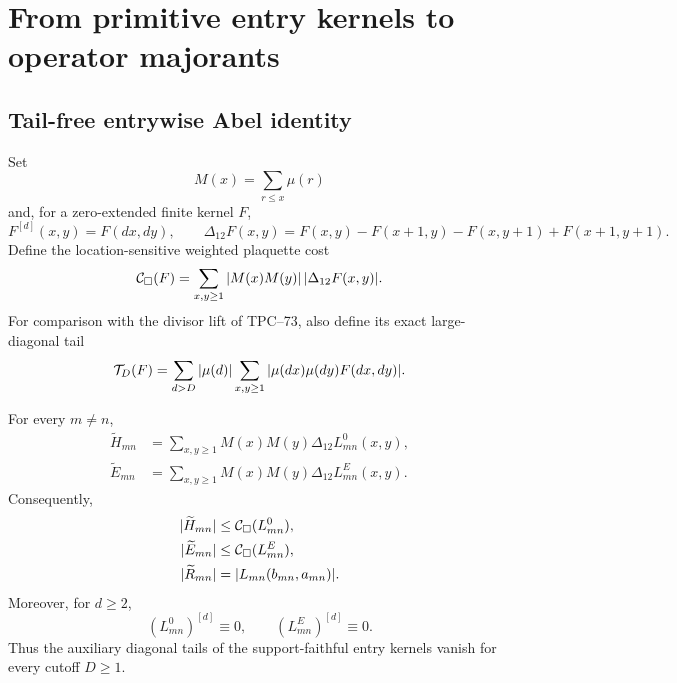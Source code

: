 \section{From primitive entry kernels to operator majorants}
\label{sec:operator-certificates}

\subsection{Tail-free entrywise Abel identity}

Set
\[
 M(x)=\sum_{r\le x}\mu(r)
\]
and, for a zero-extended finite kernel \(F\),
\[
 F^{[d]}(x,y)=F(dx,dy),
 \qquad
 \Delta_{12}F(x,y)
 =
 F(x,y)-F(x+1,y)-F(x,y+1)+F(x+1,y+1).
\]
Define the location-sensitive weighted plaquette cost
\begin{equation}
 \mathcal C_\square(F)
 =
 \sum_{x,y\ge1}
 |M(x)M(y)|\,|\Delta_{12}F(x,y)|.
 \label{eq:entry-plaquette-cost}
\end{equation}
For comparison with the divisor lift of TPC--73, also define its exact
large-diagonal tail
\begin{equation}
 \mathcal T_D(F)
 =
 \sum_{d>D}|\mu(d)|
 \sum_{x,y\ge1}|\mu(dx)\mu(dy)F(dx,dy)|.
 \label{eq:entry-diagonal-tail}
\end{equation}

\begin{theorem}
\label{thm:primitive-entry-Abel}
For every \(m\ne n\),
\begin{align}
 \widetilde H_{mn}
 &=
 \sum_{x,y\ge1}
 M(x)M(y)\Delta_{12}L_{mn}^{0}(x,y),
 \label{eq:full-entry-Abel}\\
 \widetilde E_{mn}
 &=
 \sum_{x,y\ge1}
 M(x)M(y)\Delta_{12}L_{mn}^{E}(x,y).
 \label{eq:erasure-entry-Abel}
\end{align}
Consequently,
\begin{align}
 |\widetilde H_{mn}|
 &\le \mathcal C_\square(L_{mn}^{0}),
 \label{eq:full-entry-majorant}\\
 |\widetilde E_{mn}|
 &\le \mathcal C_\square(L_{mn}^{E}),
 \label{eq:erasure-entry-majorant}\\
 |\widetilde R_{mn}|
 &=|L_{mn}(b_{mn},a_{mn})|.
 \label{eq:residual-entry-exact-magnitude}
\end{align}
Moreover, for \(d\ge2\),
\[
 (L_{mn}^{0})^{[d]}\equiv0,\qquad
 (L_{mn}^{E})^{[d]}\equiv0.
\]
Thus the auxiliary diagonal tails of the support-faithful entry kernels
vanish for every cutoff \(D\ge1\).
\end{theorem}

